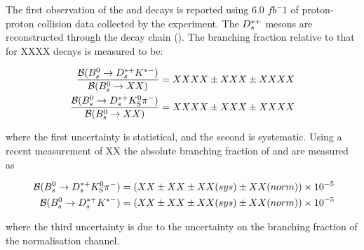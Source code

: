 The first observation of the  \Bs\to\Dss\KS\pim and \Bs\to\Dss\Kstarm decays is reported using 6.0 $fb^-1$ of proton-proton collision data collected by the \lhcb experiment. The ${{D}^{*+}_{s}}$ mesons are reconstructed through the decay chain \Dss\to\g (\Ds\to \Kp \Km \pip). The branching fraction relative to that for XXXX decays is measured to be:

\begin{align*}
    \frac{{\mathcal{B}}({{B}^0_{s}}\rightarrow{\ensuremath{{D}^{*+}_{s}}}{\ensuremath{{K}^{*-}}})}{{\mathcal{B}}({{B}^0_{s}}\rightarrow XX)} = XXXX \pm XXX \pm XXXX \\
    \frac{{\mathcal{B}}({{B}^0_{s}}\rightarrow{\ensuremath{{D}^{*+}_{s}}}{\ensuremath{{K}^0_{\mathrm{S}}}}{\ensuremath{{\pi}^-}})}{{\mathcal{B}}({{B}^0_{s}}\rightarrow XX)} = XXXX \pm XXX \pm XXXX
\end{align*}

where the first uncertainty is statistical, and the second is systematic. Using a recent measurement of \Bs\to XX  the absolute branching fraction of \Bs\to\Dss\KS\pim and \Bs\to\Dss\Kstarm are measured as 

\begin{align*}\
    {\mathcal{B}}({{B}^0_{s}}\rightarrow{\ensuremath{{D}^{*+}_{s}}}{\ensuremath{{K}^0_{\mathrm{S}}}}{\ensuremath{{\pi}^-}}) = ( XX \pm XX  \pm XX (sys) \pm XX (norm) ) \times 10^{-5} \\
    {\mathcal{B}}({{B}^0_{s}}\rightarrow{\ensuremath{{D}^{*+}_{s}}}{\ensuremath{{K}^{*-}}}) = ( XX \pm XX  \pm XX (sys) \pm XX (norm) ) \times 10^{-5}
\end{align*}

where the third uncertainty is due to the uncertainty on the branching fraction of the normalisation channel.